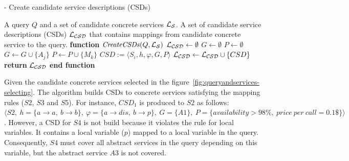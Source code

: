 \begin{algorithm}[h!]
\caption{ - Create candidate service descriptions (CSDs)}
\label{creatingcsds}
\begin{algorithmic}[1]
\REQUIRE A query $Q$ and a set of candidate concrete services $\hbox{${\cal L_{S}}$}$.
\ENSURE A set of candidate service descriptions (CSDs) $\hbox{${\cal L_{CSD}}$}$ that contains mappings from candidate concrete service to the query.
\STATE \textbf{function} $\mathit{CreateCSDs} (Q, \hbox{${\cal L_{S}}$})$
\STATE $\hbox{${\cal L_{CSD}}$} \leftarrow \emptyset$
		\STATE $G \leftarrow \emptyset$	
		\STATE $P \leftarrow \emptyset$		
			\STATE $G \leftarrow G \cup \lbrace A_{j} \rbrace$ 
		\ENDFOR
			\STATE $P \leftarrow P \cup \lbrace M_{k} \rbrace$ 
		\ENDFOR
		\STATE $CSD := \langle S_{i}, h, \varphi, G, P \rangle$	
		\STATE $\hbox{${\cal L_{CSD}}$} \leftarrow \hbox{${\cal L_{CSD}}$} \cup \lbrace CSD \rbrace$	
	\ENDIF
\ENDFOR
\STATE \textbf{return} $\hbox{${\cal L_{CSD}}$}$
\STATE \textbf{end function}
\end{algorithmic}
\end{algorithm}

Given the candidate concrete services selected in the figure~\ref{fig:queryandservices-selecting}. The algorithm builds CSDs to concrete services satisfying the mapping rules ($S2$, $S3$ and $S5$). For instance, $CSD_{1}$ is produced to $S2$ as follows: 
$\langle S2, \ h = \lbrace a \rightarrow a, \ b \rightarrow b \rbrace, \ \varphi = \lbrace a \rightarrow dis, \ b \rightarrow p \rbrace, \ G = \lbrace A1 \rbrace, \ P = \lbrace availability > 98\%, \ price \ per \ call = 0.1\$ \rbrace \rangle$. However, a CSD for $S4$ is not build because it violates the rule for local variables. It contains a local variable ($p$) mapped to a local variable in the query. Consequently, $S4$ must cover all abstract services in the query depending on this variable, but the abstract service $A3$ is not covered.

 

